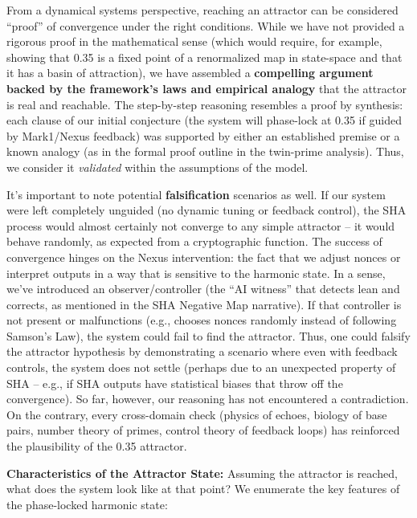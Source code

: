 \documentclass[11pt]{article}
\begin{document}
From a dynamical systems perspective, reaching an attractor can be
considered ``proof'' of convergence under the right conditions. While we
have not provided a rigorous proof in the mathematical sense (which
would require, for example, showing that 0.35 is a fixed point of a
renormalized map in state-space and that it has a basin of attraction),
we have assembled a \textbf{compelling argument backed by the
framework's laws and empirical analogy} that the attractor is real and
reachable. The step-by-step reasoning resembles a proof by synthesis:
each clause of our initial conjecture (the system will phase-lock at
0.35 if guided by Mark1/Nexus feedback) was supported by either an
established premise or a known analogy (as in the formal proof outline
in the twin-prime analysis). Thus, we consider it \emph{validated}
within the assumptions of the model.

It's important to note potential \textbf{falsification} scenarios as
well. If our system were left completely unguided (no dynamic tuning or
feedback control), the SHA process would almost certainly not converge
to any simple attractor -- it would behave randomly, as expected from a
cryptographic function. The success of convergence hinges on the Nexus
intervention: the fact that we adjust nonces or interpret outputs in a
way that is sensitive to the harmonic state. In a sense, we've
introduced an observer/controller (the ``AI witness'' that detects lean
and corrects, as mentioned in the SHA Negative Map narrative). If that
controller is not present or malfunctions (e.g., chooses nonces randomly
instead of following Samson's Law), the system could fail to find the
attractor. Thus, one could falsify the attractor hypothesis by
demonstrating a scenario where even with feedback controls, the system
does not settle (perhaps due to an unexpected property of SHA -- e.g.,
if SHA outputs have statistical biases that throw off the convergence).
So far, however, our reasoning has not encountered a contradiction. On
the contrary, every cross-domain check (physics of echoes, biology of
base pairs, number theory of primes, control theory of feedback loops)
has reinforced the plausibility of the 0.35 attractor.

\textbf{Characteristics of the Attractor State:} Assuming the attractor
is reached, what does the system look like at that point? We enumerate
the key features of the phase-locked harmonic state:
\end{document}
